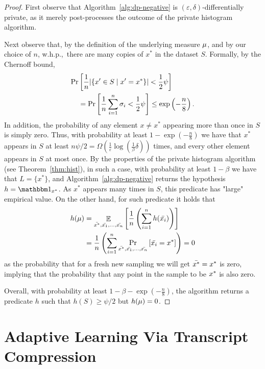 \documentclass[12pt,a4paper,oneside,onecolumn]{book}
\begin{document}
\begin{proof}
First observe that Algorithm~\ref{alg:dp-negative} is $(\varepsilon,\delta)$-differentially private, as it merely post-processes the outcome of the private histogram algorithm.

Next observe that, by the definition of the underlying measure $\mu$, and by our choice of $n$, w.h.p.,\ there are many copies of $x^*$ in the dataset $S$. Formally, by the Chernoff bound,
  \begin{align*}
    \label{eq:negative-1}
    \Pr&\left[\frac{1}{n}\lvert\{x' \in S \mid x' = x^*\}\rvert < \frac{1}{2}\psi\right] \\
    &=
    \Pr\left[\frac{1}{n}\sum_{i=1}^{n}\sigma_i < \frac{1}{2}\psi\right]
    \leq
    \exp\left(-\frac{n}{8} \right).    
  \end{align*}
In addition, the probability of any element $x\neq x^*$ appearing more than once in $S$ is simply zero. Thus, with probability at least $1-\exp\left(-\frac{n}{8} \right)$ we have that $x^*$ appears in $S$ at least $n\psi/2=\Omega(\frac{1}{\varepsilon}\log(\frac{1}{\beta}{\delta}))$ times, and every other element appears in $S$ at most once. By the properties of the private histogram algorithm (see Theorem~\ref{thm:hist}), in such a case, with probability at least $1-\beta$ we have that $L=\{x^*\}$, and Algorithm~\ref{alg:dp-negative} returns the hypothesis $h = \indicator{\seed}$. As $x^*$ appears many times in $S$, this predicate has "large" empirical value. On the other hand,
for such predicate it holds that 
\begin{align*}
  h(\mu)&
  = \mathop{\mathbb{E}}_{\bar{x^*},\bar{x_1},\ldots,\bar{x_n}}
  \left[\frac{1}{n}\left(\sum_{i=1}^{n}h(\bar{x_i})\right)\right] \\
  &= \frac{1}{n}\left(\sum_{i=1}^{n}
  \Pr_{\bar{x^*},\bar{x_1},\ldots,\bar{x_n}}
  \left[\bar{x_i}=x^*\right]\right)
  = 0    
\end{align*}
as the probability that for a fresh new sampling we will get $\bar{x^*}=x^*$ is zero,
implying that the probability that any point in the sample to be $x^*$ is also zero.

Overall, with probability at least $1-\beta-\exp\left(-\frac{n}{8} \right)$, the algorithm returns a predicate $h$ such that $h(S)\geq\psi/2$ but $h(\mu)=0$. 
  
\end{proof}

\section{Adaptive Learning Via Transcript Compression}
\label{sec:compression}
\end{document}
